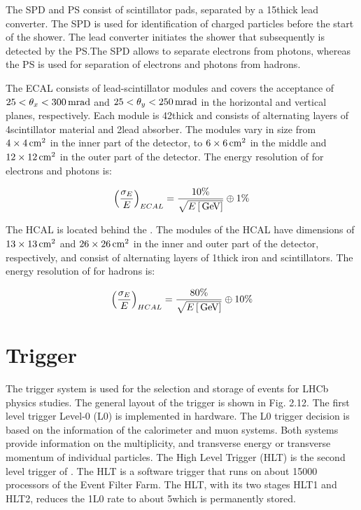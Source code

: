 The SPD and PS consist of scintillator pads, separated by a 15\mm thick lead
converter. The SPD is used for identification of charged particles before the
start of the shower. The lead converter initiates the shower that subsequently
is detected by the PS.\@ The SPD allows to separate electrons from photons,
whereas the PS is used for separation of electrons and photons from hadrons.

The ECAL consists of lead-scintillator modules and covers the acceptance of
$25<\theta_x< 300\rm \,mrad$ and $25 < \theta_y < 250\rm \,mrad$ in the horizontal and
vertical planes, respectively. Each module is 42\mm thick and consists of
alternating layers of 4\mm scintillator material and 2\mm lead absorber. The
modules vary in size from $4\times4\rm \,cm^2$ in the inner part of the detector, to
$6\times6\rm \,cm^2$ in the middle and $12\times12\rm \,cm^2$ in the outer part of the
detector. The energy resolution of \ecal for electrons and photons is: 

\begin{equation}
\left(\frac{\sigma_{E}}{E}\right)_{ECAL} = \frac{10\%}{\sqrt{E\left[\mathrm{\,Ge\kern -0.1em V}\right]}} \oplus 1\%
\label{eqn:ecal}
\end{equation}

The HCAL is located behind the \ecal. The modules of the HCAL have dimensions of
$13\times13\rm \,cm^2$ and $26\times26\rm \,cm^2$ in the inner and outer part of the
detector, respectively, and consist of alternating layers of 1\cm thick iron
and scintillators. The energy resolution of \hcal for hadrons is:

\begin{equation}
\left(\frac{\sigma_{E}}{E}\right)_{HCAL} = \frac{80\%}{\sqrt{E\left[\mathrm{\,Ge\kern -0.1em V}\right]}} \oplus 10\%
\label{eqn:ecal}
\end{equation}

\section{Trigger}

The \lhcb trigger system is used for the selection and storage of events for
LHCb physics studies. The general layout of the trigger is shown in Fig. 2.12.
The first level trigger Level-0 (L0) is implemented in hardware. The L0 trigger
decision is based on the information of the calorimeter and muon systems. Both
systems provide information on the multiplicity, and transverse energy \et or
transverse momentum \pt of individual particles. The High Level Trigger (HLT)
is the second level trigger of \lhcb. The HLT is a software trigger that runs on
about 15000 processors of the Event Filter Farm. The HLT, with its two stages
HLT1 and HLT2, reduces the 1\mhz L0 rate to about 5\khz which is permanently 
stored. 

